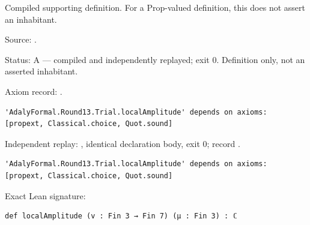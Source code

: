 \begin{definition}[bp-414]
\label{bp-414}
\leanok
Compiled supporting definition. For a Prop-valued definition, this does not assert an inhabitant.

\par Source: \texttt{}.
\par Status: A — compiled and independently replayed; exit 0. Definition only, not an asserted inhabitant.
\par Axiom record: \texttt{}.
\begin{verbatim}
'AdalyFormal.Round13.Trial.localAmplitude' depends on axioms: [propext, Classical.choice, Quot.sound]
\end{verbatim}
\par Independent replay: \texttt{}, identical declaration body, exit 0; record \texttt{}.
\begin{verbatim}
'AdalyFormal.Round13.Trial.localAmplitude' depends on axioms: [propext, Classical.choice, Quot.sound]
\end{verbatim}
\par Exact Lean signature:
\begin{verbatim}
def localAmplitude (v : Fin 3 → Fin 7) (μ : Fin 3) : ℂ
\end{verbatim}
\end{definition}

